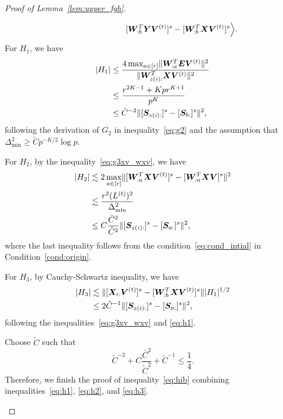 \documentclass[journal]{IEEEtran}
\theoremstyle{definition}
\theoremstyle{definition}
\begin{document}
\begin{proof}[Proof of Lemma~\ref{lem:upper_fgh}]
\begin{enumerate}[wide]
\begin{align}
        &  \quad \quad \quad \quad \quad  \quad \quad \quad [  \bm{W}_{:b}^T \bm Y \bm{V}^{(t)} ]^s -  [  \bm{W}_{:b}^T \bm X \bm{V}^{(t)} ]^s \Big\rangle.
    \end{align}
    \normalsize
    For $H_1$, we have 
    \begin{align}
        |H_1| &\leq  \frac{4 \max_{a \in [r]}\onormSize{}{ \mW_{:a}^T \mE \mV^{(t)} }^2 }{ \onormSize{}{ \mW_{z(i):}^T\mX \mV^{(t)}}^2}\\
        &\leq  \frac{ r^{2K-1} + K p r^{K+1} }{p^{K}} \\
        &\leq \tilde C^{-2} \onormSize{}{ [ \mS_{z(i):}  ]^s - [ \mS_{b:}  ]^s  }^2\label{eq:h1},
    \end{align}
    following the derivation of $G_2$ in inequality~\eqref{eq:g2} and the assumption that $\Delta_{\min}^2 \geq \tilde C p^{-K/2} \log p$.

    For $H_2$, by the inequality~\eqref{eq:g3xv_wxv}, we have 
    \begin{align}
        |H_2| &\lesssim 2\max_{a \in [r]}\onormSize{}{[\mW_{:a}^T\mX \mV^{(t)}]^s - [\mW_{:a}^T\mX \mV]^s }^2 \\
        &\lesssim \frac{r^2 (L^{(t)})^2}{\Delta_{\min}^2} \\
        &\leq C \frac{\bar C^2}{ \tilde C^2} \onormSize{}{ [ \mS_{z(i):} ]^s - [ \mS_{a:}]^s }^2, \label{eq:h2}
    \end{align}
    where the last inequality follows from the condition~\eqref{eq:cond_intial} in Condition~\ref{cond:origin}.
    
      For $H_3$,  by Cauchy-Schwartz inequality, we have 
      \begin{align}
           |H_3| & \lesssim \onormSize{}{[\mX_{i:} \mV^{(t)}]^s  -  [  \mW_{:b}^T \mX \mV^{(t)} ]^s} |H_1|^{1/2} \\
           &\leq 2 \tilde C^{-1} \onormSize{}{ [ \mS_{z(i):} ]^s - [ \mS_{a:}]^s }^2,\label{eq:h3}
      \end{align}
    following the inequalities~\eqref{eq:g3xv_wxv} and \eqref{eq:h1}.
    
    Choose $\tilde C$ such that 
    \begin{equation}\label{eq:tilde_c2}
        \tilde C^{-2} + C \frac{\bar C^2}{ \tilde C^2} + \tilde C^{-1} \leq \frac{1}{4}.
    \end{equation}
     Therefore, we finish the proof of inequality~\eqref{eq:hib} combining inequalities~\eqref{eq:h1}, \eqref{eq:h2}, and \eqref{eq:h3}.

\end{enumerate}
{
  
}
\end{proof}
\end{document}
